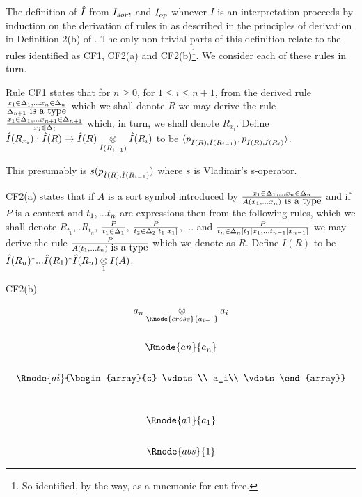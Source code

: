 \note The definition of $\Ihat$ from $\Isort$ and $\Iop$ whnever $I$ is an interpretation proceeds by induction 
on the derivation of rules in  \gatUw 
as described in the principles of derivation in Definition 2(b) of \cite{Cartmell86}. 
The only non-trivial parts of this definition relate to the rules
identified as CF1, CF2(a) and CF2(b)\footnote{So identified, by the way, as a mnemonic for cut-free.}. We consider each of these rules in turn.

\begin{point}
Rule CF1 states that for $n \geq 0$, for $1 \leq i \leq n+1$, from the derived rule 
$\frac{\xDelta{n}}{\isT{\Delta_{n+1}}}$ which we shall denote $R$ 
we may derive the rule
$\frac{\xDelta{n+1}}{\ofT{x_i}{\Delta_i}}$ which, in turn, we shall denote $R_{x_i}$.
Define $\Ihat(R_{x_i}) :  \Ihat(R) \morph \crossx{\Ihat(R)}{\Ihat(R_i)}{\Ihat(R_{i-1})}$
to be $\tuple{p_{\Ihat(R),\Ihat(R_{i-1})},p_{\Ihat(R),\Ihat(R_{i})}}$. 

This presumably is $s(p_{\Ihat(R),\Ihat(R_{i-1})})$ where $s$ is Vladimir's s-operator.
\end{point}
\begin{point}
CF2(a) states that if $A$ is a sort symbol introduced by
$\frac{\xDelta{n}}{\isT{A(\xn)}}$ 
and if $P$ is a context and $\tn$ are expressions then from the following rules, which we shall denote $R_{t_1}$,..$R_{t_n}$,
$\frac{P}{\ofT{t_1}{\Delta_1}}$,
$\frac{P}{\ofT{t_2}{\Delta_2[t_1|x_1]}}$,
... and 
$\frac{P}{\ofT{t_n}{\Delta_n[t_1|x_1,...t_{n-1}|x_{n-1}]}}$
we may derive the rule
$\frac{P}{\isT{A(t_1,...t_n)}}$ which we denote as $R$. 
Define $I(R)$ to be $\Ihat(R_n)^*...\Ihat(R_1)^*\crossx{\Ihat(R_n)}{I(A)}{1}$.
\end{point}
\begin{point}
CF2(b) 
\end{point}

\begin{oldtt}
\begin{displaymath}
\begin{array}{c}
\crossx{a_n}{a_i}{\Rnode{cross}{a_{i-1}}} \\[0.9cm]
\Rnode{an}{a_n}\\[0.7cm]
\Rnode{ai}{\begin{array}{c}
\vdots\\
a_i\\
\vdots
\end{array}} \\[1.1cm]
\Rnode{a1}{a_1}\\[0.7cm]
\Rnode{abs}{1}
\end{array}
\end{displaymath}
\end{oldtt}

